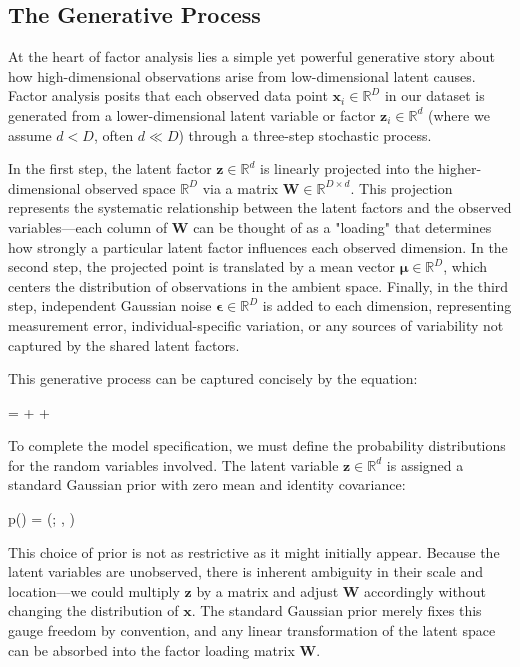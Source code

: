 \subsection*{The Generative Process}

At the heart of factor analysis lies a simple yet powerful generative story about how high-dimensional observations arise from low-dimensional latent causes. Factor analysis posits that each observed data point $\mathbf{x}_i \in \mathbb{R}^D$ in our dataset is generated from a lower-dimensional latent variable or factor $\mathbf{z}_i \in \mathbb{R}^d$ (where we assume $d < D$, often $d \ll D$) through a three-step stochastic process.

In the first step, the latent factor $\mathbf{z} \in \mathbb{R}^d$ is linearly projected into the higher-dimensional observed space $\mathbb{R}^D$ via a matrix $\mathbf{W} \in \mathbb{R}^{D \times d}$. This projection represents the systematic relationship between the latent factors and the observed variables—each column of $\mathbf{W}$ can be thought of as a "loading" that determines how strongly a particular latent factor influences each observed dimension. In the second step, the projected point is translated by a mean vector $\boldsymbol{\mu} \in \mathbb{R}^D$, which centers the distribution of observations in the ambient space. Finally, in the third step, independent Gaussian noise $\boldsymbol{\epsilon} \in \mathbb{R}^D$ is added to each dimension, representing measurement error, individual-specific variation, or any sources of variability not captured by the shared latent factors.

This generative process can be captured concisely by the equation:
\begin{myequation}
 =  + \boldsymbol{\mu} + \boldsymbol{\epsilon}
\end{myequation}

To complete the model specification, we must define the probability distributions for the random variables involved. The latent variable $\mathbf{z} \in \mathbb{R}^d$ is assigned a standard Gaussian prior with zero mean and identity covariance:
\begin{myequation}
p() = (; , )
\end{myequation}

This choice of prior is not as restrictive as it might initially appear. Because the latent variables are unobserved, there is inherent ambiguity in their scale and location—we could multiply $\mathbf{z}$ by a matrix and adjust $\mathbf{W}$ accordingly without changing the distribution of $\mathbf{x}$. The standard Gaussian prior merely fixes this gauge freedom by convention, and any linear transformation of the latent space can be absorbed into the factor loading matrix $\mathbf{W}$.

